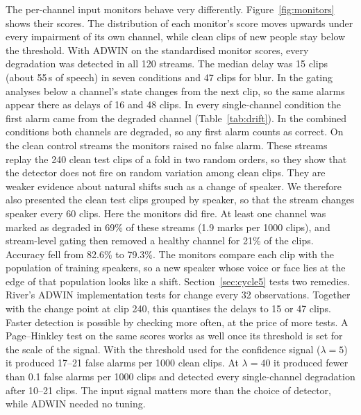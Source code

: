 The per-channel input monitors behave very differently. Figure~\ref{fig:monitors} shows their scores. The distribution of each monitor's score moves upwards under every impairment of its own channel, while clean clips of new people stay below the threshold. With ADWIN on the standardised monitor scores, every degradation was detected in all 120 streams. The median delay was 15 clips (about 55\,s of speech) in seven conditions and 47 clips for blur. In the gating analyses below a channel's state changes from the next clip, so the same alarms appear there as delays of 16 and 48 clips. In every single-channel condition the first alarm came from the degraded channel (Table~\ref{tab:drift}). In the combined conditions both channels are degraded, so any first alarm counts as correct. On the clean control streams the monitors raised no false alarm. These streams replay the 240 clean test clips of a fold in two random orders, so they show that the detector does not fire on random variation among clean clips. They are weaker evidence about natural shifts such as a change of speaker. We therefore also presented the clean test clips grouped by speaker, so that the stream changes speaker every 60 clips. Here the monitors did fire. At least one channel was marked as degraded in 69\% of these streams (1.9 marks per 1000 clips), and stream-level gating then removed a healthy channel for 21\% of the clips. Accuracy fell from 82.6\% to 79.3\%. The monitors compare each clip with the population of training speakers, so a new speaker whose voice or face lies at the edge of that population looks like a shift. Section~\ref{sec:cycle5} tests two remedies. River's ADWIN implementation tests for change every 32 observations. Together with the change point at clip 240, this quantises the delays to 15 or 47 clips. Faster detection is possible by checking more often, at the price of more tests. A Page--Hinkley test on the same scores works as well once its threshold is set for the scale of the signal. With the threshold used for the confidence signal ($\lambda=5$) it produced 17--21 false alarms per 1000 clean clips. At $\lambda=40$ it produced fewer than 0.1 false alarms per 1000 clips and detected every single-channel degradation after 10--21 clips. The input signal matters more than the choice of detector, while ADWIN needed no tuning.

